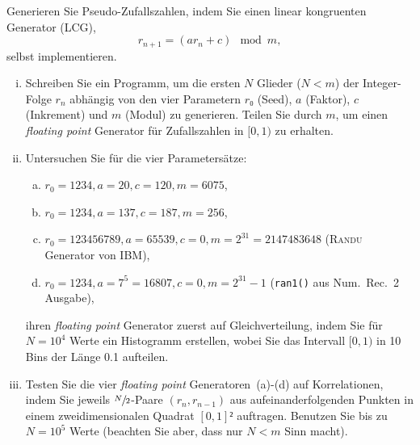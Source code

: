 
\NewDocumentCommand{}
\date{Ausgabe: Di, 16.04.2019, Besprechung: Fr, 26.04.2019}
\setcounter{question}{3}


\maketitle

\begin{question}[subtitle=Linear kongruente Generatoren]
  Generieren Sie Pseudo-Zufallszahlen, indem Sie einen linear kongruenten Generator (LCG),
  \begin{equation}
    \label{eq:1}
    r_{n + 1} = \left( a r_n + c \right) \mod m,
  \end{equation}
  selbst implementieren.

  \begin{enumerate}[(i)]
  \item Schreiben Sie ein Programm, um die ersten $N$ Glieder ($N < m$) der Integer-Folge $r_n$ abhängig von den vier Parametern $r₀$ (Seed), $a$ (Faktor), $c$ (Inkrement) und $m$ (Modul) zu generieren.
    Teilen Sie durch $m$, um einen \textit{floating point} Generator für Zufallszahlen in $[0, 1)$ zu erhalten.
  \item Untersuchen Sie für die vier Parametersätze:
    \begin{enumerate}[(a)]
    \item\label{item:1} $r_0 = 1234, a = 20, c = 120, m = 6075$,
    \item\label{item:2} $r_0 = 1234, a = 137, c = 187, m = 256$,
    \item\label{item:3} $r_0 = 123456789, a = 65539, c = 0, m = 2^{31} = 2147483648$ (\textsc{Randu} Generator von IBM),
    \item\label{item:4} $r_0 = 1234, a = 7^5 = 16807, c = 0, m = 2^{31} - 1$ (\texttt{ran1()} aus Num.\ Rec.\ 2 Ausgabe),
    \end{enumerate}
    ihren \textit{floating point} Generator zuerst auf Gleichverteilung, indem Sie für $N = 10^4$ Werte ein Histogramm erstellen, wobei Sie das Intervall $[0, 1)$ in \num{10} Bins der Länge \num{0.1} aufteilen.
  \item Testen Sie die vier \textit{floating point} Generatoren~(a)-(d) auf Korrelationen, indem Sie jeweils $\sfrac{N}{2}$-Paare $(r_n, r_{n - 1})$ aus aufeinanderfolgenden Punkten in einem zweidimensionalen Quadrat $[0, 1]²$ auftragen.
    Benutzen Sie bis zu $N = 10^5$ Werte (beachten Sie aber, dass nur $N < m$ Sinn macht).
  \end{enumerate}
\end{question}

